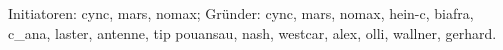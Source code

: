 Initiatoren: cync, mars, nomax; Gründer: cync, mars, nomax, hein-c, biafra, c_ana, laster, antenne, tip pouansau, nash, westcar, alex, olli, wallner, gerhard.